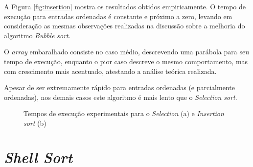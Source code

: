 \documentclass[12pt]{article}
\begin{document}
A Figura \ref{fig:insertion} mostra os resultados obtidos empiricamente. O tempo de execução para entradas ordenadas é constante e próximo a zero, levando em consideração as mesmas observações realizadas na discussão sobre a melhoria do algoritmo \textit{Bubble sort}.

O \textit{array} embaralhado consiste no caso médio, descrevendo uma parábola para seu tempo de execução, enquanto o pior caso descreve o mesmo comportamento, mas com crescimento mais acentuado, atestando a análise teórica realizada.

Apesar de ser extremamente rápido para entradas ordenadas (e parcialmente ordenadas), nos demais casos este algoritmo é mais lento que o \textit{Selection sort}.


\begin{figure}[!h]%
    \caption{Tempos de execução experimentais para o \textit{Selection} (a) e \textit{Insertion sort} (b)}%
\end{figure}





\section{\textit{Shell Sort}}
\end{document}
